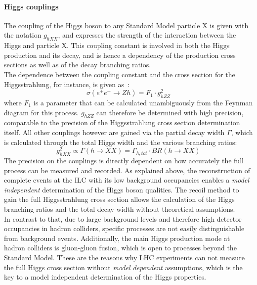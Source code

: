 \paragraph{Higgs couplings}
The coupling of the Higgs boson to any Standard Model particle X is given with the notation $g_{hXX}$, and expresses the strength of the interaction between the Higgs and particle X.
This coupling constant is involved in both the Higgs production and its decay, and is hence a dependency of the production cross sections as well as of the decay branching ratios.\\
The dependence between the coupling constant and the cross section for the Higgsstrahlung, for instance, is given as~\cite[p. 4]{PhysicsCase_Junping}:
\begin{equation}
 \sigma(e^+e^-\rightarrow Zh)=F_1\cdot g^2_{hZZ}
\end{equation}
where $F_1$ is a parameter that can be calculated unambiguously from the Feynman diagram for this process.
$g_{hZZ}$ can therefore be determined with high precision, comparable to the precision of the Higgsstrahlung cross section determination itself.
\newpage
All other couplings however are gained via the partial decay width $\Gamma$, which is calculated through the total Higgs width and the various branching ratios:
\begin{equation}
 g^2_{hXX}\propto\Gamma(h\rightarrow XX)=\Gamma_{h,tot}\cdot BR(h\rightarrow XX)
\end{equation}
The precision on the couplings is directly dependent on how accurately the full process can be measured and recorded.
As explained above, the reconstruction of complete events at the ILC with its low background occupancies enables a \textit{model independent} determination of the Higgs boson qualities.
The recoil method to gain the full Higgsstrahlung cross section allows the calculation of the Higgs branching ratios and the total decay width without theoretical assumptions.
\\In contrast to that, due to large background levels and therefore high detector occupancies in hadron colliders, specific processes are not easily distinguishable from background events.
Additionally, the main Higgs production mode at hadron colliders is gluon-gluon fusion, which is open to processes beyond the Standard Model.
These are the reasons why LHC experiments can not measure the full Higgs cross section without \textit{model dependent} assumptions, which is the key to a model independent determination of the Higgs properties.
